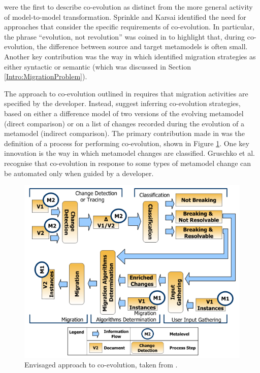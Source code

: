 \cite{sprinkle04domain} were the first to describe co-evolution as distinct from the more general activity of model-to-model transformation. Sprinkle and Karsai identified the need for approaches that consider the specific requirements of co-evolution. In particular, the phrase ``evolution, not revolution'' was coined in \cite{sprinkle03thesis} to highlight that, during co-evolution, the difference between source and target metamodels is often small. Another key contribution was the way in which \cite{sprinkle04domain} identified migration strategies as either syntactic or semantic (which was discussed in Section \ref{Intro:MigrationProblem}).

The approach to co-evolution outlined in \cite{sprinkle04domain} requires that migration activities are specified by the developer. Instead, \cite{gruschko07towards} suggest inferring co-evolution strategies, based on either a difference model of two versions of the evolving metamodel (direct comparison) or on a list of changes recorded during the evolution of a metamodel (indirect comparison). The primary contribution made in \cite{sprinkle04domain} was the definition of a process for performing co-evolution, shown in Figure \ref{fig:coevoprocess}. One key innovation is the way in which metamodel changes are classified. Gruschko et al. recognise that co-evolution in response to some types of metamodel change can be automated only when guided by a developer.

\begin{figure}[htbp]
  \begin{center}
    \leavevmode
    \includegraphics[scale=0.6]{3.LiteratureReview/images/CoEvoProcess.png}
  \end{center}
  \caption{Envisaged approach to co-evolution, taken from \cite{gruschko07towards}.}
  \label{fig:coevoprocess}
\end{figure}

